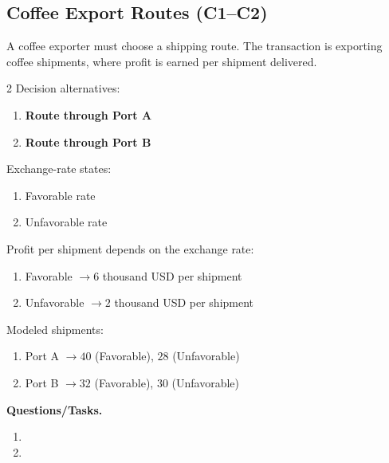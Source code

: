 	\subsection{Coffee Export Routes (C1--C2)}
	\label{sec:problem6-coffee-export-routes-c1-c2}
	A coffee exporter must choose a shipping route. The transaction is exporting coffee shipments, where profit is earned per shipment delivered.
	
	\begin{multicols}{2}
		Decision alternatives:
		\begin{enumerate}[label=\arabic*.]
			\item \textbf{Route through Port A}
			\item \textbf{Route through Port B}
		\end{enumerate}
	
		Exchange-rate states:
		\begin{enumerate}[label=\arabic*.]
			\item Favorable rate
			\item Unfavorable rate
		\end{enumerate}
	
			\columnbreak
	
		Profit per shipment depends on the exchange rate:
		\begin{enumerate}[label=\arabic*.]
			\item Favorable $\to 6$ thousand USD per shipment
			\item Unfavorable $\to 2$ thousand USD per shipment
		\end{enumerate}
	
		Modeled shipments:
		\begin{enumerate}[label=\arabic*.]
			\item Port A $\to 40$ (Favorable), $28$ (Unfavorable)
			\item Port B $\to 32$ (Favorable), $30$ (Unfavorable)
		\end{enumerate}
	\end{multicols}

	\textbf{Questions/Tasks.}
	\begin{enumerate}[label=\textbf{\alph*)}]
		\item {}
		\item {}
	\end{enumerate}
	
